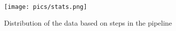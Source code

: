 
\begin{figure}[ht]
    \centering
    \texttt{[image: pics/stats.png]}
    \vspace{-7pt}
    \caption{Distribution of the data based on steps in the pipeline
    }
    
    \label{fig:distribution}
    \vspace{-10pt}
    
\end{figure}
